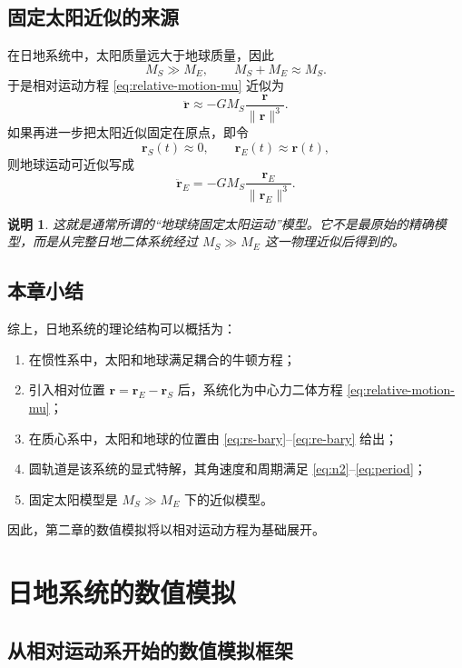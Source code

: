 \documentclass[12pt,a4paper]{ctexrep}
\newtheorem*{remark}{说明}
\begin{document}
\section{固定太阳近似的来源}

在日地系统中，太阳质量远大于地球质量，因此
\[
M_S\gg M_E,
\qquad
M_S+M_E\approx M_S.
\]
于是相对运动方程 \eqref{eq:relative-motion-mu} 近似为
\begin{equation}\label{eq:approx-relative}
\ddot{\bm r}\approx -GM_S\frac{\bm r}{\|\bm r\|^3}.
\end{equation}
如果再进一步把太阳近似固定在原点，即令
\[
\bm r_S(t)\approx 0,
\qquad
\bm r_E(t)\approx \bm r(t),
\]
则地球运动可近似写成
\begin{equation}\label{eq:earth-around-fixed-sun}
\ddot{\bm r}_E=-GM_S\frac{\bm r_E}{\|\bm r_E\|^3}.
\end{equation}

\begin{remark}
这就是通常所谓的“地球绕固定太阳运动”模型。它不是最原始的精确模型，而是从完整日地二体系统经过 \(M_S\gg M_E\) 这一物理近似后得到的。
\end{remark}

\section{本章小结}

综上，日地系统的理论结构可以概括为：
\begin{enumerate}[label=\arabic*.]
  \item 在惯性系中，太阳和地球满足耦合的牛顿方程；
  \item 引入相对位置 \(\bm r=\bm r_E-\bm r_S\) 后，系统化为中心力二体方程 \eqref{eq:relative-motion-mu}；
  \item 在质心系中，太阳和地球的位置由 \eqref{eq:rs-bary}--\eqref{eq:re-bary} 给出；
  \item 圆轨道是该系统的显式特解，其角速度和周期满足 \eqref{eq:n2}--\eqref{eq:period}；
  \item 固定太阳模型是 \(M_S\gg M_E\) 下的近似模型。
\end{enumerate}

因此，第二章的数值模拟将以相对运动方程为基础展开。

\chapter{日地系统的数值模拟}

\section{从相对运动系开始的数值模拟框架}
\end{document}
